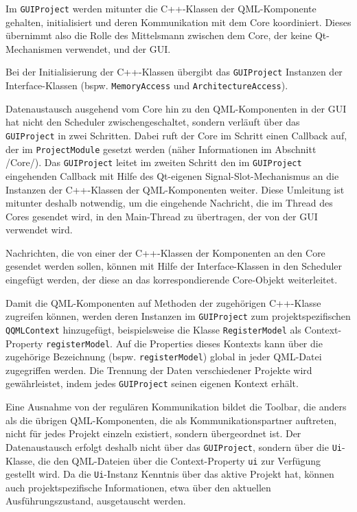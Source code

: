 Im \texttt{GUIProject} werden mitunter die C++-Klassen der QML-Komponente
gehalten, initialisiert und deren Kommunikation mit dem Core koordiniert. Dieses
übernimmt also die Rolle des Mittelsmann zwischen dem Core, der keine
Qt-Mechanismen verwendet, und der GUI.

Bei der Initialisierung der C++-Klassen übergibt das \texttt{GUIProject}
Instanzen der Interface-Klassen (bspw. \texttt{MemoryAccess} und
\texttt{ArchitectureAccess}).

Datenaustausch ausgehend vom Core hin zu den QML-Komponenten in der GUI hat
nicht den Scheduler zwischengeschaltet, sondern verläuft über das
\texttt{GUIProject} in zwei Schritten. Dabei ruft der Core im Schritt einen
Callback auf, der im \texttt{ProjectModule} gesetzt werden (näher Informationen
im Abschnitt /Core/). Das \texttt{GUIProject} leitet im zweiten Schritt den im
\texttt{GUIProject} eingehenden Callback mit Hilfe des Qt-eigenen
Signal-Slot-Mechanismus an die Instanzen der C++-Klassen der QML-Komponenten
weiter. Diese Umleitung ist mitunter deshalb notwendig, um die eingehende
Nachricht, die im Thread des Cores gesendet wird, in den Main-Thread zu
übertragen, der von der GUI verwendet wird.

Nachrichten, die von einer der C++-Klassen der Komponenten an den Core gesendet
werden sollen, können mit Hilfe der Interface-Klassen in den Scheduler eingefügt
werden, der diese an das korrespondierende Core-Objekt weiterleitet.

Damit die QML-Komponenten auf Methoden der zugehörigen C++-Klasse zugreifen
können, werden deren Instanzen im \texttt{GUIProject} zum projektspezifischen
\texttt{QQMLContext} hinzugefügt, beispielsweise die Klasse
\texttt{RegisterModel} als Context-Property \texttt{registerModel}. Auf die
Properties dieses Kontexts kann über die zugehörige Bezeichnung (bspw.
\texttt{registerModel}) global in jeder QML-Datei zugegriffen werden. Die
Trennung der Daten verschiedener Projekte wird gewährleistet, indem jedes
\texttt{GUIProject} seinen eigenen Kontext erhält.

Eine Ausnahme von der regulären Kommunikation bildet die Toolbar, die anders als
die übrigen QML-Komponenten, die als Kommunikationspartner auftreten, nicht für
jedes Projekt einzeln existiert, sondern übergeordnet ist. Der Datenaustausch
erfolgt deshalb nicht über das \texttt{GUIProject}, sondern über die
\texttt{Ui}-Klasse, die den QML-Dateien über die Context-Property \texttt{ui}
zur Verfügung gestellt wird. Da die \texttt{Ui}-Instanz Kenntnis über das aktive
Projekt hat, können auch projektspezifische Informationen, etwa über den
aktuellen Ausführungszustand, ausgetauscht werden.

